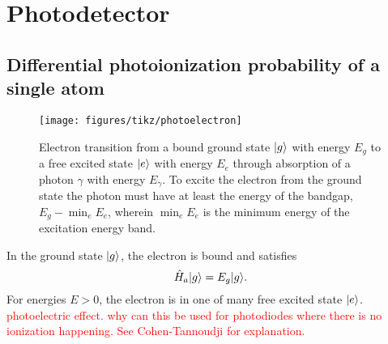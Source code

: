 \section{Photodetector}

\subsection{Differential photoionization probability of a single atom}

\begin{figure}[htb]
    \centering
    \texttt{[image: figures/tikz/photoelectron]}
    \caption{Electron transition from a bound ground state $\lvert g\rangle$ with energy $E_g$ to a free excited state $\lvert e\rangle$ with energy $E_e$ through absorption of a photon $\gamma$ with energy $E_\gamma$. To excite the electron from the ground state the photon must have at least the energy of the bandgap, $E_g-\min_eE_e$, wherein $\min_eE_e$ is the minimum energy of the excitation energy band.}
\end{figure}

In the ground state $\lvert g\rangle$, the electron is bound and satisfies
\begin{equation}
	\hat{H}_a
	\lvert g\rangle
	=
	E_g
	\lvert g\rangle
	.
\end{equation}
For energies $E>0$, the electron is in one of many free excited state $\lvert e\rangle$.
\textcolor{red}{photoelectric effect. why can this be used for photodiodes where there is no ionization happening. See Cohen-Tannoudji for explanation.}

